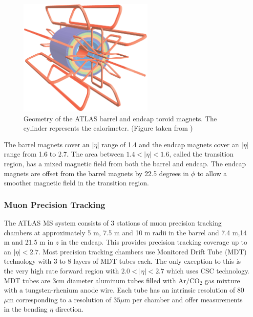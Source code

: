 \begin{figure}[h!]
\centering
\includegraphics[width=0.60\textwidth, angle=270]{figures/LHC_ATLAS/ATLcoilGeom.eps}
\caption[Geometry of the ATLAS barrel and endcap toroid magnets]{ Geometry of the ATLAS barrel and endcap toroid magnets. The cylinder represents the calorimeter. (Figure taken from \cite{ATLAS_JINST}) \label{LHC:fig:ATLASMag}}
\end{figure}

\indent The barrel magnets cover an |$\eta$| range of 1.4 and the endcap magnets cover an |$\eta$| range from 1.6 to 2.7. The area between $1.4 < |\eta| < 1.6$, called the transition region, has a mixed magnetic field from both the barrel and endcap. The endcap magnets are offset from the barrel magnets by 22.5 degrees in $\phi$ to allow a smoother magnetic field in the transition region. \\

\subsubsection*{Muon Precision Tracking}

\indent The ATLAS MS system consists of 3 stations of muon precision tracking chambers at approximately 5 m, 7.5 m and 10 m radii in the barrel and 7.4 m,14 m and 21.5 m in $z$ in the endcap.  This provides precision tracking coverage up to an $|\eta| < 2.7$.  Most precision tracking chambers use Monitored Drift Tube (MDT) technology with 3 to 8 layers of MDT tubes each.  The only exception to this is the very high rate forward region with $2.0 < |\eta| < 2.7$ which uses CSC technology. \\

\indent  MDT tubes are 3cm diameter aluminum tubes filled with Ar/CO$_2$ gas mixture with a tungsten-rhenium anode wire.  Each tube has an intrinsic resolution of 80 $\mu$m corresponding to a resolution of $35 \mu$m per chamber and offer measurements in the bending $\eta$ direction.  \\

